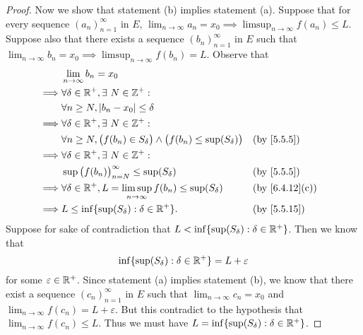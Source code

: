 \begin{proof}
  Now we show that statement (b) implies statement (a).
  Suppose that for every sequence \((a_n)_{n = 1}^\infty\) in \(E\), \(\lim_{n \to \infty} a_n = x_0 \implies \limsup_{n \to \infty} f(a_n) \leq L\).
  Suppose also that there exists a sequence \((b_n)_{n = 1}^\infty\) in \(E\) such that \(\lim_{n \to \infty} b_n = x_0 \implies \limsup_{n \to \infty} f(b_n) = L\).
  Observe that
  \begin{align*}
             & \lim_{n \to \infty} b_n = x_0                                                                                                    \\
    \implies & \forall \delta \in \R^+, \exists\ N \in \Z^+ :                                                                                   \\
             & \forall n \geq N, \abs{b_n - x_0} \leq \delta                                                                                    \\
    \implies & \forall \delta \in \R^+, \exists\ N \in \Z^+ :                                                                                   \\
             & \forall n \geq N, \big(f(b_n) \in S_{\delta}\big) \land \big(f(b_n) \leq \sup(S_{\delta})\big) &  & \by{5.5.5}                   \\
    \implies & \forall \delta \in \R^+, \exists\ N \in \Z^+ :                                                                                   \\
             & \sup\big(f(b_n)\big)_{n = N}^\infty \leq \sup(S_{\delta})                                      &  & \by{5.5.5}                   \\
    \implies & \forall \delta \in \R^+, L = \limsup_{n \to \infty} f(b_n) \leq \sup(S_{\delta})               &  & \text{(by \cref{6.4.12}(c))} \\
    \implies & L \leq \inf\{\sup(S_{\delta}) : \delta \in \R^+\}.                                             &  & \text{(by \cref{5.5.15})}
  \end{align*}
  Suppose for sake of contradiction that \(L < \inf\{\sup(S_\delta) : \delta \in \mathbb{R}^+\}\).
  Then we know that
  \[
    \inf\{\sup(S_\delta) : \delta \in \mathbb{R}^+\} = L + \varepsilon
  \]
  for some \(\varepsilon \in \mathbb{R}^+\).
  Since statement (a) implies statement (b), we know that there exist a sequence \((c_n)_{n = 1}^\infty\) in \(E\) such that \(\lim_{n \to \infty} c_n = x_0\) and \(\lim_{n \to \infty} f(c_n) = L + \varepsilon\).
  But this contradict to the hypothesis that \(\lim_{n \to \infty} f(c_n) \leq L\).
  Thus we must have \(L = \inf\{\sup(S_{\delta}) : \delta \in \mathbb{R}^+\}\).
\end{proof}

